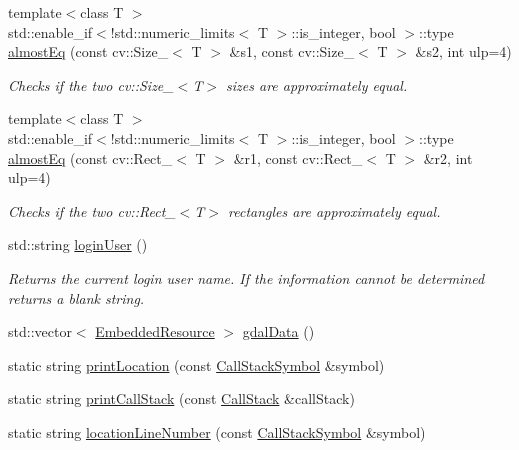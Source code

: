 \begin{DoxyCompactItemize}
{\footnotesize template$<$class T $>$ }\\std\+::enable\+\_\+if$<$!std\+::numeric\+\_\+limits$<$ T $>$\+::is\+\_\+integer, bool $>$\+::type \hyperlink{group___utility_module_ga71b9189756badfb3f5466bf9f0549203}{almost\+Eq} (const cv\+::\+Size\+\_\+$<$ T $>$ \&s1, const cv\+::\+Size\+\_\+$<$ T $>$ \&s2, int ulp=4)
\begin{DoxyCompactList}\small\item\em Checks if the two cv\+::\+Size\+\_\+$<$\+T$>$ sizes are approximately equal. \end{DoxyCompactList}\item 
{\footnotesize template$<$class T $>$ }\\std\+::enable\+\_\+if$<$!std\+::numeric\+\_\+limits$<$ T $>$\+::is\+\_\+integer, bool $>$\+::type \hyperlink{group___utility_module_ga115e2428efbb3b6d3105d8f2fab75e51}{almost\+Eq} (const cv\+::\+Rect\+\_\+$<$ T $>$ \&r1, const cv\+::\+Rect\+\_\+$<$ T $>$ \&r2, int ulp=4)
\begin{DoxyCompactList}\small\item\em Checks if the two cv\+::\+Rect\+\_\+$<$\+T$>$ rectangles are approximately equal. \end{DoxyCompactList}\item 
std\+::string \hyperlink{group___utility_module_ga7eb961cce72452d6bc60ca27f699bad6}{login\+User} ()
\begin{DoxyCompactList}\small\item\em Returns the current login user name. If the information cannot be determined returns a blank string. \end{DoxyCompactList}\item 
std\+::vector$<$ \hyperlink{structdg_1_1deepcore_1_1_embedded_resource}{Embedded\+Resource} $>$ \hyperlink{namespacedg_1_1deepcore_a03f6e7d5cdfe836e05971aebdfe39af2}{gdal\+Data} ()
\item 
static string \hyperlink{namespacedg_1_1deepcore_a9d0f58fd1a0292fb3052154364aec9f3}{print\+Location} (const \hyperlink{structdg_1_1deepcore_1_1_call_stack_symbol}{Call\+Stack\+Symbol} \&symbol)
\item 
static string \hyperlink{namespacedg_1_1deepcore_a02b20c0a6eedaa272f75d8df3d729ac4}{print\+Call\+Stack} (const \hyperlink{group___utility_module_gabdf2d70ae3aab3c57142eddec69a725c}{Call\+Stack} \&call\+Stack)
\item 
static string \hyperlink{namespacedg_1_1deepcore_a1d661483dd2b1f082cc4bd2de5960afd}{location\+Line\+Number} (const \hyperlink{structdg_1_1deepcore_1_1_call_stack_symbol}{Call\+Stack\+Symbol} \&symbol)

\end{DoxyCompactItemize}
